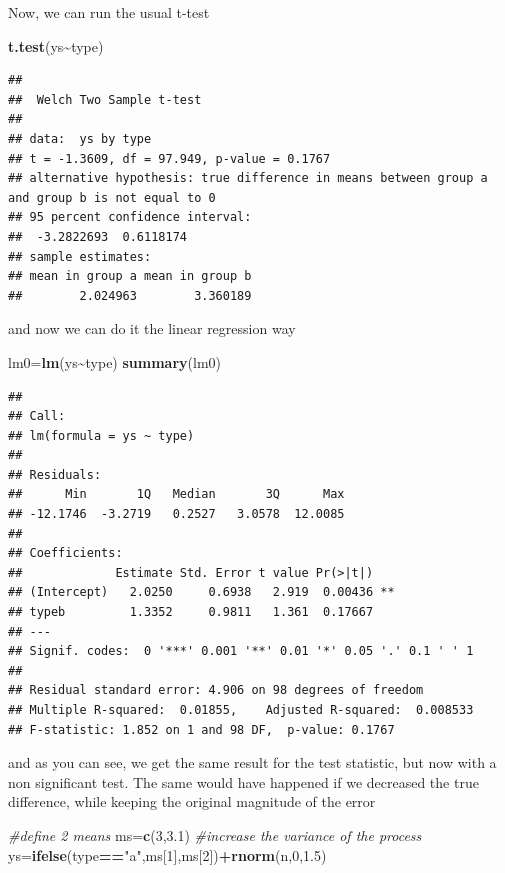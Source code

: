 \documentclass[
]{book}
\newenvironment{Shaded}{\begin{snugshade}}{\end{snugshade}}
\newcommand{\CommentTok}[1]{\textcolor[rgb]{0.56,0.35,0.01}{\textit{#1}}}
\newcommand{\DecValTok}[1]{\textcolor[rgb]{0.00,0.00,0.81}{#1}}
\newcommand{\FloatTok}[1]{\textcolor[rgb]{0.00,0.00,0.81}{#1}}
\newcommand{\FunctionTok}[1]{\textcolor[rgb]{0.13,0.29,0.53}{\textbf{#1}}}
\newcommand{\NormalTok}[1]{#1}
\newcommand{\OtherTok}[1]{\textcolor[rgb]{0.56,0.35,0.01}{#1}}
\newcommand{\SpecialCharTok}[1]{\textcolor[rgb]{0.81,0.36,0.00}{\textbf{#1}}}
\newcommand{\StringTok}[1]{\textcolor[rgb]{0.31,0.60,0.02}{#1}}
\begin{document}
Now, we can run the usual t-test

\begin{Shaded}
\begin{Highlighting}[]
\FunctionTok{t.test}\NormalTok{(ys}\SpecialCharTok{\textasciitilde{}}\NormalTok{type)}
\end{Highlighting}
\end{Shaded}

\begin{verbatim}
## 
##  Welch Two Sample t-test
## 
## data:  ys by type
## t = -1.3609, df = 97.949, p-value = 0.1767
## alternative hypothesis: true difference in means between group a and group b is not equal to 0
## 95 percent confidence interval:
##  -3.2822693  0.6118174
## sample estimates:
## mean in group a mean in group b 
##        2.024963        3.360189
\end{verbatim}

and now we can do it the linear regression way

\begin{Shaded}
\begin{Highlighting}[]
\NormalTok{lm0}\OtherTok{=}\FunctionTok{lm}\NormalTok{(ys}\SpecialCharTok{\textasciitilde{}}\NormalTok{type)}
\FunctionTok{summary}\NormalTok{(lm0)}
\end{Highlighting}
\end{Shaded}

\begin{verbatim}
## 
## Call:
## lm(formula = ys ~ type)
## 
## Residuals:
##      Min       1Q   Median       3Q      Max 
## -12.1746  -3.2719   0.2527   3.0578  12.0085 
## 
## Coefficients:
##             Estimate Std. Error t value Pr(>|t|)   
## (Intercept)   2.0250     0.6938   2.919  0.00436 **
## typeb         1.3352     0.9811   1.361  0.17667   
## ---
## Signif. codes:  0 '***' 0.001 '**' 0.01 '*' 0.05 '.' 0.1 ' ' 1
## 
## Residual standard error: 4.906 on 98 degrees of freedom
## Multiple R-squared:  0.01855,    Adjusted R-squared:  0.008533 
## F-statistic: 1.852 on 1 and 98 DF,  p-value: 0.1767
\end{verbatim}

and as you can see, we get the same result for the test statistic, but now with a non significant test.
The same would have happened if we decreased the true difference, while keeping the original magnitude of the error

\begin{Shaded}
\begin{Highlighting}[]
\CommentTok{\#define 2 means}
\NormalTok{ms}\OtherTok{=}\FunctionTok{c}\NormalTok{(}\DecValTok{3}\NormalTok{,}\FloatTok{3.1}\NormalTok{)}
\CommentTok{\#increase the variance of the process}
\NormalTok{ys}\OtherTok{=}\FunctionTok{ifelse}\NormalTok{(type}\SpecialCharTok{==}\StringTok{"a"}\NormalTok{,ms[}\DecValTok{1}\NormalTok{],ms[}\DecValTok{2}\NormalTok{])}\SpecialCharTok{+}\FunctionTok{rnorm}\NormalTok{(n,}\DecValTok{0}\NormalTok{,}\FloatTok{1.5}\NormalTok{)}
\end{Highlighting}
\end{Shaded}
\end{document}
